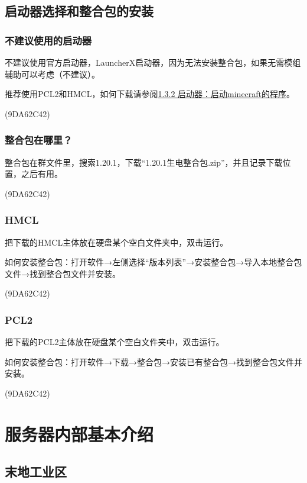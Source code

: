 \documentclass[UTF8,a4paper]{article}
\begin{document}
		\subsection{启动器选择和整合包的安装}
			\hypertarget{qidongqixuanze}{}
			\subsubsection{不建议使用的启动器}
				\par 不建议使用官方启动器，LauncherX启动器，因为无法安装整合包，如果无需模组辅助可以考虑（不建议）。
				\par 推荐使用PCL2和HMCL，如何下载请参阅\hyperlink{qidongqi}{1.3.2 启动器：启动minecraft的程序}。
				\begin{flushright}(9DA62C42)\end{flushright}
			\subsubsection{整合包在哪里？}
				\par 整合包在群文件里，搜索1.20.1，下载“1.20.1生电整合包.zip”，并且记录下载位置，之后有用。
				\begin{flushright}(9DA62C42)\end{flushright}
			\subsubsection{HMCL}
				\par 把下载的HMCL主体放在硬盘某个空白文件夹中，双击运行。
				\par 如何安装整合包：打开软件→左侧选择“版本列表”→安装整合包→导入本地整合包文件→找到整合包文件并安装。
				\begin{flushright}(9DA62C42)\end{flushright}
			\subsubsection{PCL2}
				\par 把下载的PCL2主体放在硬盘某个空白文件夹中，双击运行。
				\par 如何安装整合包：打开软件→下载→整合包→安装已有整合包→找到整合包文件并安装。
				\begin{flushright}(9DA62C42)\end{flushright}
	\section{服务器内部基本介绍}
		\subsection{末地工业区}
\end{document}
